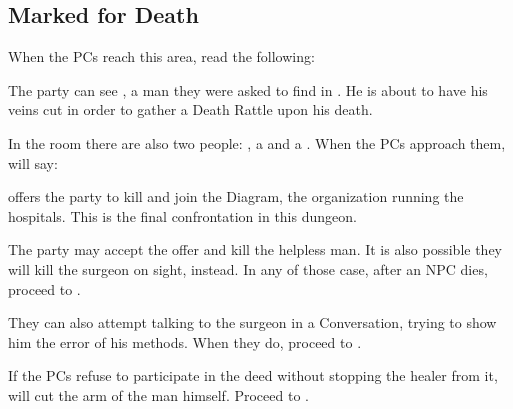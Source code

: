\newpage
\subsection{Marked for Death}
\label{ssec:conclaveHospitalPatient}

When the PCs reach this area, read the following:


The party can see \npcGhostbloodWounded{}, a man they were asked to find in . He is about to have his veins cut in order to gather a Death Rattle upon his death.

In the room there are also two people: \npcDiagramSurgeon{}, a \enemyDiagramSurgeon{} and a \enemyDiagramScribe{}. When the PCs approach them, \npcDiagramSurgeon{} will say:


\npcDiagramSurgeon{} offers the party to kill \npcGhostbloodWounded{} and join the Diagram, the organization running the hospitals. This is the final confrontation in this dungeon.

The party may accept the offer and kill the helpless man. It is also possible they will kill the surgeon on sight, instead. In any of those case, after an NPC dies, proceed to . 

They can also attempt talking to the surgeon in a Conversation, trying to show him the error of his methods. When they do, proceed to .

If the PCs refuse to participate in the deed without stopping the healer from it, \npcDiagramSurgeon{} will cut the arm of the man himself. Proceed to .


